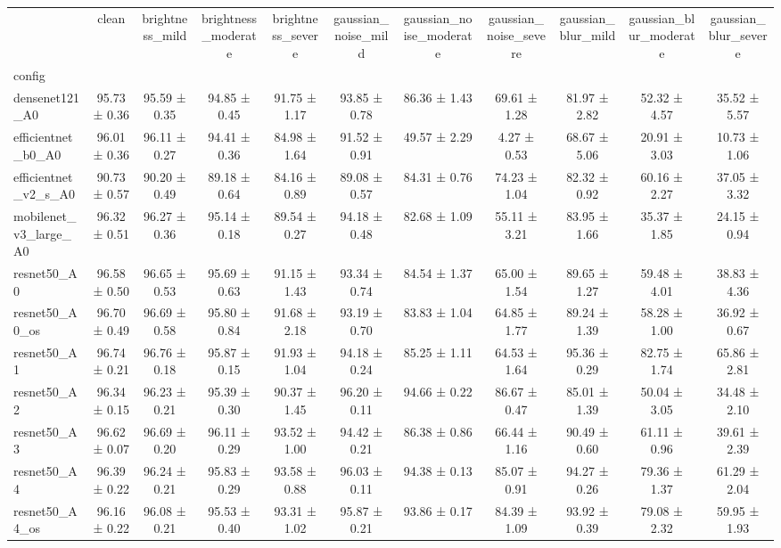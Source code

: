 \begin{tabular}{lcccccccccc}
\toprule
 & clean & brightness\_mild & brightness\_moderate & brightness\_severe & gaussian\_noise\_mild & gaussian\_noise\_moderate & gaussian\_noise\_severe & gaussian\_blur\_mild & gaussian\_blur\_moderate & gaussian\_blur\_severe \\
config &  &  &  &  &  &  &  &  &  &  \\
\midrule
densenet121\_A0 & 95.73 ± 0.36 & 95.59 ± 0.35 & 94.85 ± 0.45 & 91.75 ± 1.17 & 93.85 ± 0.78 & 86.36 ± 1.43 & 69.61 ± 1.28 & 81.97 ± 2.82 & 52.32 ± 4.57 & 35.52 ± 5.57 \\
efficientnet\_b0\_A0 & 96.01 ± 0.36 & 96.11 ± 0.27 & 94.41 ± 0.36 & 84.98 ± 1.64 & 91.52 ± 0.91 & 49.57 ± 2.29 & 4.27 ± 0.53 & 68.67 ± 5.06 & 20.91 ± 3.03 & 10.73 ± 1.06 \\
efficientnet\_v2\_s\_A0 & 90.73 ± 0.57 & 90.20 ± 0.49 & 89.18 ± 0.64 & 84.16 ± 0.89 & 89.08 ± 0.57 & 84.31 ± 0.76 & 74.23 ± 1.04 & 82.32 ± 0.92 & 60.16 ± 2.27 & 37.05 ± 3.32 \\
mobilenet\_v3\_large\_A0 & 96.32 ± 0.51 & 96.27 ± 0.36 & 95.14 ± 0.18 & 89.54 ± 0.27 & 94.18 ± 0.48 & 82.68 ± 1.09 & 55.11 ± 3.21 & 83.95 ± 1.66 & 35.37 ± 1.85 & 24.15 ± 0.94 \\
resnet50\_A0 & 96.58 ± 0.50 & 96.65 ± 0.53 & 95.69 ± 0.63 & 91.15 ± 1.43 & 93.34 ± 0.74 & 84.54 ± 1.37 & 65.00 ± 1.54 & 89.65 ± 1.27 & 59.48 ± 4.01 & 38.83 ± 4.36 \\
resnet50\_A0\_os & 96.70 ± 0.49 & 96.69 ± 0.58 & 95.80 ± 0.84 & 91.68 ± 2.18 & 93.19 ± 0.70 & 83.83 ± 1.04 & 64.85 ± 1.77 & 89.24 ± 1.39 & 58.28 ± 1.00 & 36.92 ± 0.67 \\
resnet50\_A1 & 96.74 ± 0.21 & 96.76 ± 0.18 & 95.87 ± 0.15 & 91.93 ± 1.04 & 94.18 ± 0.24 & 85.25 ± 1.11 & 64.53 ± 1.64 & 95.36 ± 0.29 & 82.75 ± 1.74 & 65.86 ± 2.81 \\
resnet50\_A2 & 96.34 ± 0.15 & 96.23 ± 0.21 & 95.39 ± 0.30 & 90.37 ± 1.45 & 96.20 ± 0.11 & 94.66 ± 0.22 & 86.67 ± 0.47 & 85.01 ± 1.39 & 50.04 ± 3.05 & 34.48 ± 2.10 \\
resnet50\_A3 & 96.62 ± 0.07 & 96.69 ± 0.20 & 96.11 ± 0.29 & 93.52 ± 1.00 & 94.42 ± 0.21 & 86.38 ± 0.86 & 66.44 ± 1.16 & 90.49 ± 0.60 & 61.11 ± 0.96 & 39.61 ± 2.39 \\
resnet50\_A4 & 96.39 ± 0.22 & 96.24 ± 0.21 & 95.83 ± 0.29 & 93.58 ± 0.88 & 96.03 ± 0.11 & 94.38 ± 0.13 & 85.07 ± 0.91 & 94.27 ± 0.26 & 79.36 ± 1.37 & 61.29 ± 2.04 \\
resnet50\_A4\_os & 96.16 ± 0.22 & 96.08 ± 0.21 & 95.53 ± 0.40 & 93.31 ± 1.02 & 95.87 ± 0.21 & 93.86 ± 0.17 & 84.39 ± 1.09 & 93.92 ± 0.39 & 79.08 ± 2.32 & 59.95 ± 1.93 \\
\bottomrule
\end{tabular}
